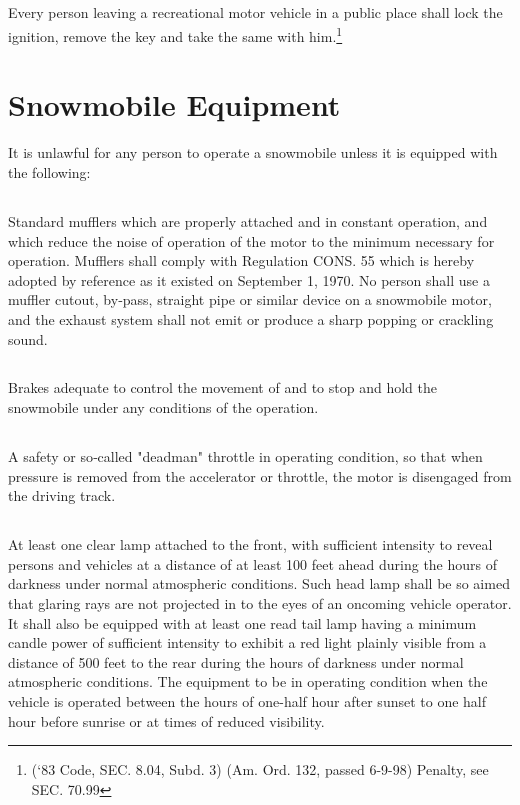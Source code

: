 \subsection{}
Every person leaving a recreational motor vehicle in a public place shall lock the ignition, remove the key and take the same with him.\footnote{(‘83 Code, SEC. 8.04, Subd. 3) (Am. Ord. 132, passed 6-9-98) Penalty, see SEC. 70.99}

\section{Snowmobile Equipment}
It is unlawful for any person to operate a snowmobile unless it is equipped with the following:
\subsection{}
Standard mufflers which are properly attached and in constant operation, and which reduce the noise of operation of the motor to the minimum necessary for operation. Mufflers shall comply with Regulation CONS. 55 which is hereby adopted by reference as it existed on September 1, 1970. No person shall use a muffler cut­out, by‑pass, straight pipe or similar device on a snowmobile motor, and the exhaust system shall not emit or produce a sharp popping or crackling sound.
\subsection{}
Brakes adequate to control the movement of and to stop and hold the snowmobile under any conditions of the operation.
\subsection{}
A safety or so‑called "deadman" throttle in operating condition, so that when pressure is removed from the accelerator or throttle, the motor is disengaged from the driving track.
\subsection{}
At least one clear lamp attached to the front, with sufficient intensity to reveal persons and vehicles at a distance of at least 100 feet ahead during the hours of darkness under normal atmospheric conditions. Such head lamp shall be so aimed that glaring rays are not projected in to the eyes of an oncoming vehicle operator. It shall also be equipped with at least one read tail lamp having a minimum candle power of sufficient intensity to exhibit a red light plainly visible from a distance of 500 feet to the rear during the hours of darkness under normal atmospheric conditions. The equipment to be in operating condition when the vehicle is operated between the hours of one-half hour after sunset to one half hour before sunrise or at times of reduced visibility.
